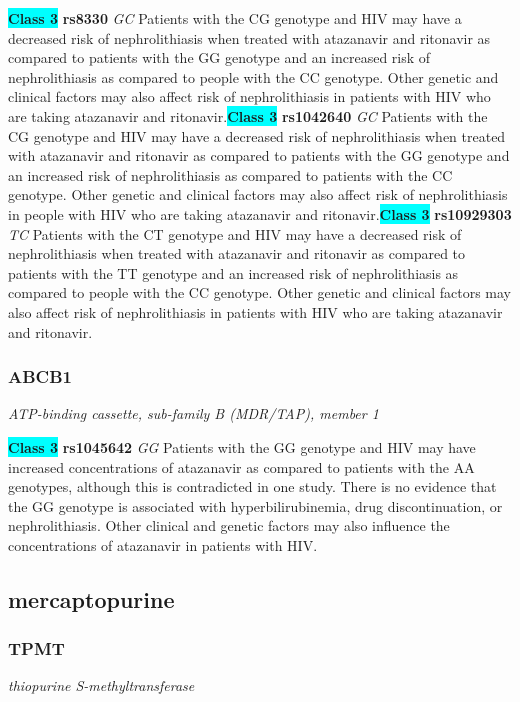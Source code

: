 \documentclass{report}
\begin{document}
\textbf{\colorbox{cyan} {Class 3}} \textbf{ rs8330 } \textit{ GC }
Patients with the CG genotype and HIV may have a decreased risk of nephrolithiasis when treated with atazanavir and ritonavir as compared to patients with the GG genotype and an increased risk of nephrolithiasis as compared to people with the CC genotype. Other genetic and clinical factors may also affect risk of nephrolithiasis in patients with HIV who are taking atazanavir and ritonavir.\newline\textbf{\colorbox{cyan} {Class 3}} \textbf{ rs1042640 } \textit{ GC }
Patients with the CG genotype and HIV may have a decreased risk of nephrolithiasis when treated with atazanavir and ritonavir as compared to patients with the GG genotype and an increased risk of nephrolithiasis as compared to patients with the CC genotype. Other genetic and clinical factors may also affect risk of nephrolithiasis in people with HIV who are taking atazanavir and ritonavir.\newline\textbf{\colorbox{cyan} {Class 3}} \textbf{ rs10929303 } \textit{ TC }
Patients with the CT genotype and HIV may have a decreased risk of nephrolithiasis when treated with atazanavir and ritonavir as compared to patients with the TT genotype and an increased risk of nephrolithiasis as compared to people with the CC genotype. Other genetic and clinical factors may also affect risk of nephrolithiasis in patients with HIV who are taking atazanavir and ritonavir. \newline\subsubsection{ ABCB1 }
\textit{ ATP-binding cassette, sub-family B (MDR/TAP), member 1 }

\textbf{\colorbox{cyan} {Class 3}} \textbf{ rs1045642 } \textit{ GG }
Patients with the GG genotype and HIV may have increased concentrations of atazanavir as compared to patients with the AA genotypes, although this is contradicted in one study. There is no evidence that the GG genotype is associated with hyperbilirubinemia, drug discontinuation, or nephrolithiasis.  Other clinical and genetic factors may also influence the concentrations of atazanavir in patients with HIV. \newline\subsection{ mercaptopurine }\subsubsection{ TPMT }
\textit{ thiopurine S-methyltransferase }
\end{document}
